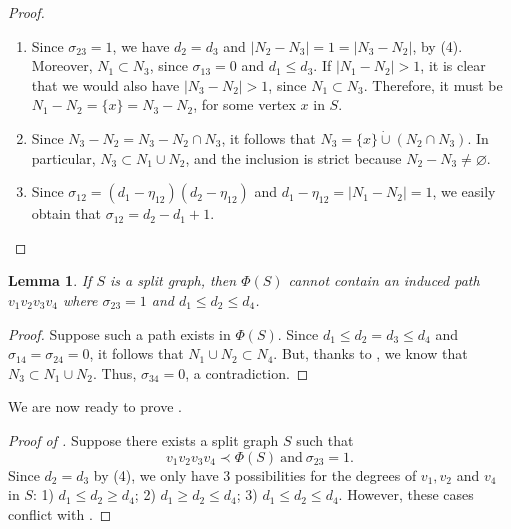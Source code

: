 \documentclass[11pt]{elsarticle}
\newtheorem{lemma}[lemma]{Lemma}
\begin{document}
\begin{proof}
	\begin{enumerate}[(1).]
		\item Since $\sigma_{23}=1$, we have $d_2=d_3$ and $|N_2-N_3|=1=|N_3-N_2|$, by (4). Moreover, $N_1\subset N_3$, since $\sigma_{13}=0$ and $d_1\leq d_3$. If $|N_1-N_2|>1$, it is clear that we would also have $|N_3-N_2|>1$, since $N_1\subset N_3$. Therefore, it must be $N_1-N_2=\{x\}=N_3-N_2$, for some vertex $x$ in $S$.
		
		\item Since $N_3-N_2=N_3-N_2\cap N_3$, it follows that $N_3=\{x\}\dot{\cup}(N_2\cap N_3)$. In particular, $N_3\subset N_1\cup N_2$, and the inclusion is strict because $N_2-N_3\neq\varnothing$.
		
		\item Since $\sigma_{12}=(d_1-\eta_{12})(d_2-\eta_{12})$ and $d_1-\eta_{12}=|N_1-N_2|=1$, we easily obtain that $\sigma_{12}=d_2-d_1+1$.
	\end{enumerate}
\end{proof}

\begin{lemma}
	\label{prohibido.P_4.sigma_23=1.d_1<d_2<d_4}
	If $S$ is a split graph, then $\Phi(S)$ cannot contain an induced path $v_1 v_2 v_3 v_4$ where $\sigma_{23}=1$ and $d_1\leq d_2\leq d_4$.
\end{lemma}

\begin{proof}
	Suppose such a path exists in $\Phi(S)$. Since $d_1\leq d_2=d_3\leq d_4$ and $\sigma_{14}=\sigma_{24}=0$, it follows that $N_1\cup N_2\subset N_4$. But, thanks to , we know that $N_3\subset N_1\cup N_2$. Thus, $\sigma_{34}=0$, a contradiction.
\end{proof}

We are now ready to prove .

\begin{proof}[Proof of ]
	Suppose there exists a split graph $S$ such that
	\[ v_1v_2v_3v_4\prec\Phi(S) \ \text{and} \ \sigma_{23}=1. \]
	Since $d_2=d_3$ by (4), we only have 3 possibilities for the degrees of $v_1, v_2$ and $v_4$ in $S$: 1) $d_1\leq d_2\geq d_4$; 2) $d_1\geq d_2\leq d_4$; 3) $d_1\leq d_2\leq d_4$. However, these cases conflict with .
\end{proof}
\end{document}
